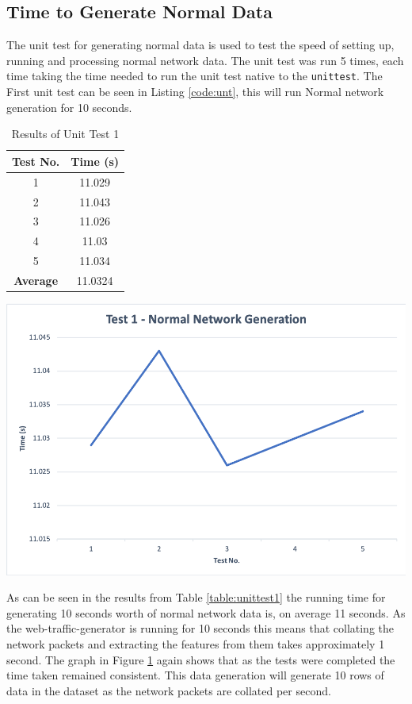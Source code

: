 \subsection{Time to Generate Normal Data}
The unit test for generating normal data is used to test the speed of setting up, running and processing normal network data. The unit test was run 5 times, each time taking the time needed to run the unit test native to the \texttt{unittest}. The First unit test can be seen in Listing \ref{code:unt}, this will run Normal network generation for 10 seconds.
\begin{table}[H]
	\begin{minipage}{0.4\linewidth}
        \centering
        \caption{Results of Unit Test 1}
        \label{table:unittest1}
        \begin{tabular}{cc}
         \textbf{Test No.}&\textbf{Time (s)}\\
         \hline
            1&	11.029\\
            2&	11.043\\
            3&	11.026\\
            4&	11.03\\
            5&	11.034\\
            \hline
            \textbf{Average} & 11.0324
        \end{tabular}
	\end{minipage}\hfill
	\begin{minipage}{0.6\linewidth}
            \centering
            \includegraphics[scale = 0.4]{Images/Results/unittest1.png}
             \label{fig:unittest1}
	\end{minipage}
\end{table}
As can be seen in the results from Table \ref{table:unittest1} the running time for generating 10 seconds worth of normal network data is, on average 11 seconds. As the web-traffic-generator is running for 10 seconds this means that collating the network packets and extracting the features from them takes approximately 1 second. The graph in Figure \ref{fig:unittest1} again shows that as the tests were completed the time taken remained consistent. This data generation will generate 10 rows of data in the dataset as the network packets are collated per second.

